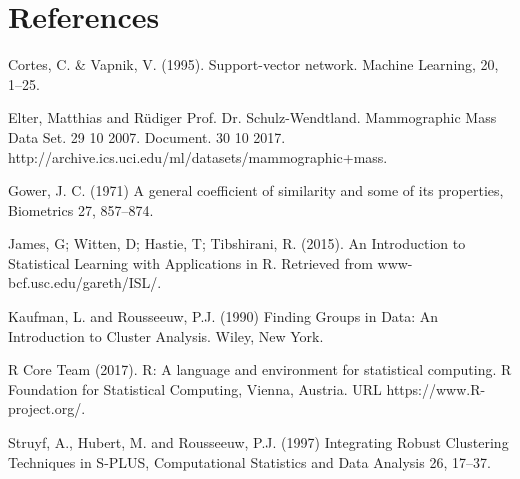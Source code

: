 \documentclass[11pt]{article}
\begin{document}
	\section{References}
	Cortes, C. \& Vapnik, V. (1995). Support-vector network. Machine Learning, 20, 1–25.
	
	Elter, Matthias and Rüdiger Prof. Dr. Schulz-Wendtland. Mammographic Mass Data Set. 29 10 2007. Document. 30 10 2017. http://archive.ics.uci.edu/ml/datasets/mammographic+mass.
	
	Gower, J. C. (1971) A general coefficient of similarity and some of its properties, Biometrics 27, 857--874.
	
	James, G; Witten, D; Hastie, T; Tibshirani, R. (2015). An Introduction to Statistical Learning with Applications in R. Retrieved from www-bcf.usc.edu/gareth/ISL/.
	
	Kaufman, L. and Rousseeuw, P.J. (1990) Finding Groups in Data: An Introduction to Cluster Analysis. Wiley, New York. 
	
	R Core Team (2017). R: A language and environment for statistical computing. R Foundation for Statistical Computing, Vienna, Austria. URL https://www.R-project.org/.
	
	Struyf, A., Hubert, M. and Rousseeuw, P.J. (1997) Integrating Robust Clustering Techniques in S-PLUS, Computational Statistics and Data Analysis 26, 17--37.
	
\end{document}

